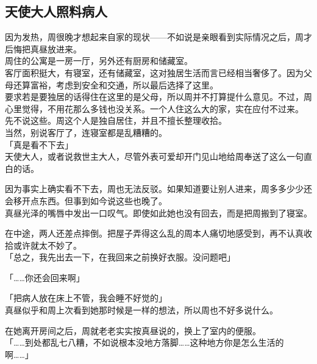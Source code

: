 \subsection{天使大人照料病人}

因为发热，周很晚才想起来自家的现状——不如说是亲眼看到实际情况之后，周才后悔把真昼放进来。\\

周住的公寓是一房一厅，另外还有厨房和储藏室。\\

客厅面积挺大，有寝室，还有储藏室，这对独居生活而言已经相当奢侈了。因为父母还算富裕，考虑到安全和交通，所以最后选择了这里。\\

要求若是要独居的话得住在这里的是父母，所以周并不打算提什么意见。不过，周心里觉得，不用花那么多钱也没关系。一个人住这么大的家，实在应付不过来。\\

先不说这些。周这个人是独自居住，并且不擅长整理收拾。\\

当然，别说客厅了，连寝室都是乱糟糟的。\\

「真是看不下去」\\

天使大人，或者说救世主大人，尽管外表可爱却开门见山地给周奉送了这么一句直白的话。

因为事实上确实看不下去，周也无法反驳。如果知道要让别人进来，周多多少少还会移开点东西。但事到如今说这些也晚了。\\

真昼光泽的嘴唇中发出一口叹气。即使如此她也没有回去，而是把周搬到了寝室。

在中途，两人还差点摔倒。把屋子弄得这么乱的周本人痛切地感受到，再不认真收拾或许就太不妙了。\\

「总之，我先出去一下，在我回来之前换好衣服。没问题吧」

「……你还会回来啊」

「把病人放在床上不管，我会睡不好觉的」\\

真昼似乎和周上次看到她那时候是一样的想法，所以周也不好多说什么。

在她离开房间之后，周就老老实实按真昼说的，换上了室内的便服。\\

「……到处都乱七八糟，不如说根本没地方落脚……这种地方你是怎么生活的啊……」\\

